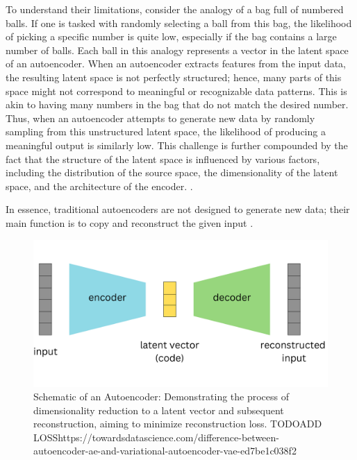To understand their limitations, consider the analogy of a bag full of numbered balls. If one is tasked with randomly selecting a ball from this bag, the likelihood of picking a specific number is quite low, especially if the bag contains a large number of balls. Each ball in this analogy represents a vector in the latent space of an autoencoder. When an autoencoder extracts features from the input data, the resulting latent space is not perfectly structured; hence, many parts of this space might not correspond to meaningful or recognizable data patterns. This is akin to having many numbers in the bag that do not match the desired number. Thus, when an autoencoder attempts to generate new data by randomly sampling from this unstructured latent space, the likelihood of producing a meaningful output is similarly low. This challenge is further compounded by the fact that the structure of the latent space is influenced by various factors, including the distribution of the source space, the dimensionality of the latent space, and the architecture of the encoder.
\citep{michelucci2022introduction}.

In essence, traditional autoencoders are not designed to generate new data; their main function is to copy and reconstruct the given input \citep{GoodfellowDeepLearning}.

\begin{figure}[ht]
    \centering
      \hspace{.8cm}
      \includegraphics[width=.7\columnwidth]{figures/Autoencoder.png}
      \caption{Schematic of an Autoencoder: Demonstrating the process of dimensionality reduction to a latent vector and subsequent reconstruction, aiming to minimize reconstruction loss. TODO\@ ADD LOSS\@ https://towardsdatascience.com/difference-between-autoencoder-ae-and-variational-autoencoder-vae-ed7be1c038f2}\label{fig:figureAE}
\end{figure}

